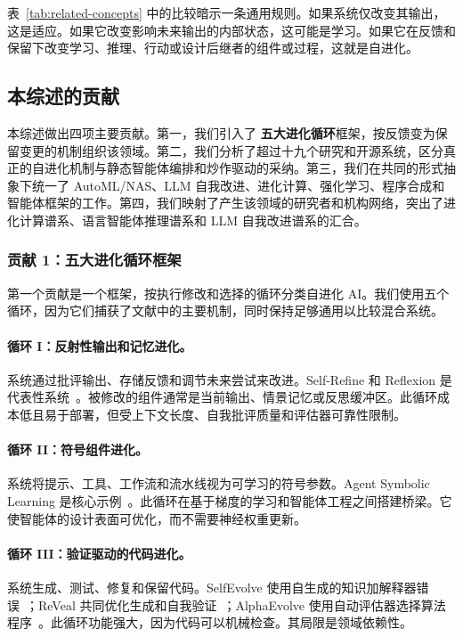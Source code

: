 表~\ref{tab:related-concepts} 中的比较暗示一条通用规则。如果系统仅改变其输出，这是适应。如果它改变影响未来输出的内部状态，这可能是学习。如果它在反馈和保留下改变学习、推理、行动或设计后继者的组件或过程，这就是自进化。

\subsection{本综述的贡献}\label{sec:intro-contributions}

本综述做出四项主要贡献。第一，我们引入了 \textbf{五大进化循环}框架，按反馈变为保留变更的机制组织该领域。第二，我们分析了超过十九个研究和开源系统，区分真正的自进化机制与静态智能体编排和炒作驱动的采纳。第三，我们在共同的形式抽象下统一了 AutoML/NAS、LLM 自我改进、进化计算、强化学习、程序合成和智能体框架的工作。第四，我们映射了产生该领域的研究者和机构网络，突出了进化计算谱系、语言智能体推理谱系和 LLM 自我改进谱系的汇合。

\subsubsection{贡献 1：五大进化循环框架}

第一个贡献是一个框架，按执行修改和选择的循环分类自进化 AI。我们使用五个循环，因为它们捕获了文献中的主要机制，同时保持足够通用以比较混合系统。

\paragraph{循环 I：反射性输出和记忆进化。} 系统通过批评输出、存储反馈和调节未来尝试来改进。Self-Refine 和 Reflexion 是代表性系统~\citep{selfrefine2023,reflexion2023}。被修改的组件通常是当前输出、情景记忆或反思缓冲区。此循环成本低且易于部署，但受上下文长度、自我批评质量和评估器可靠性限制。

\paragraph{循环 II：符号组件进化。} 系统将提示、工具、工作流和流水线视为可学习的符号参数。Agent Symbolic Learning 是核心示例~\citep{agentsymboliclearning2024}。此循环在基于梯度的学习和智能体工程之间搭建桥梁。它使智能体的设计表面可优化，而不需要神经权重更新。

\paragraph{循环 III：验证驱动的代码进化。} 系统生成、测试、修复和保留代码。SelfEvolve 使用自生成的知识加解释器错误~\citep{selfevolve2023}；ReVeal 共同优化生成和自我验证~\citep{reveal2025}；AlphaEvolve 使用自动评估器选择算法程序~\citep{alphaevolve2025}。此循环功能强大，因为代码可以机械检查。其局限是领域依赖性。

